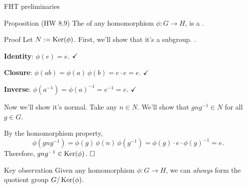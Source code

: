 \documentclass[8pt]{beamer}
\newcommand{\Pause}{}      %
\begin{document}

\begin{frame}{FHT preliminaries}
  
  \begin{block}{Proposition (HW 8.9)}
    The  of any homomorphism $\phi\colon G\to
    H$, is a .
  \end{block}
  
  \begin{exampleblock}{Proof} \Pause
    Let $N:=\operatorname{Ker}(\phi)$. First, we'll show that it's a
    subgroup. \Pause {}. \medskip\pause
    
    \textbf{Identity}: $\phi(e)=e$. $\hfill\checkmark$
    
    \medskip\pause
    
    \textbf{Closure}:
    $\phi(ab)\Pause=\phi(a)\,\phi(b)\Pause=e\cdot e=e$. $\hfill\checkmark$
    
    \medskip\pause
    
    \textbf{Inverse}:
    $\phi(a^{-1})\Pause=\phi(a)^{-1}\Pause=e^{-1}\Pause=e$. 
    $\hfill\checkmark$ \medskip\pause
    
    Now we'll show it's normal. \Pause Take any $n\in N$. We'll show that
    $gng^{-1}\in N$ for all $g\in G$. \medskip\pause
    
    By the homomorphism property,
    \[
    \phi(gng^{-1})\Pause=\phi(g)\,\phi(n)\,\phi(g^{-1})
    \Pause=\phi(g)\cdot e\cdot\phi(g)^{-1}\Pause=e.
    \]
    \Pause Therefore, $gng^{-1}\in\operatorname{Ker}(\phi)$. $\hfill\Box$
  \end{exampleblock}
  
  \Pause
  
  \begin{alertblock}{Key observation}
    Given any homomorphism $\phi\colon G\to H$, we can \emph{always}
    form the quotient group $G/\operatorname{Ker}(\phi)$.
  \end{alertblock}
  
\end{frame}

\end{document}

